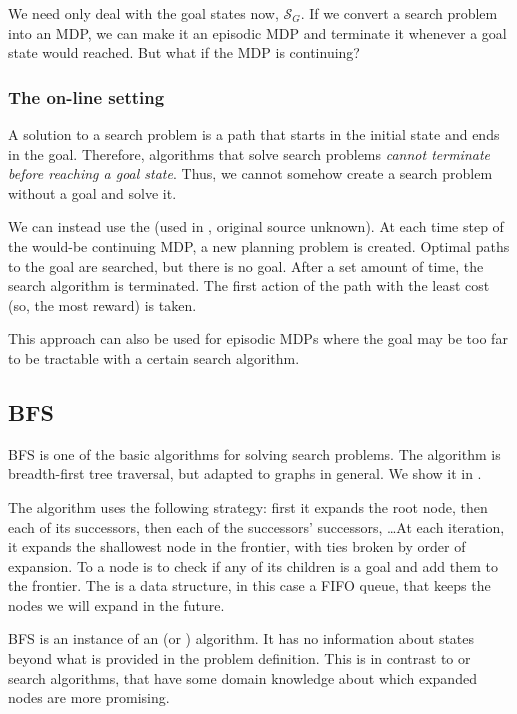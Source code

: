 We need only deal with the goal states now, $\mathcal{S}_G$. If we convert a
search problem into an \ac{MDP}, we can make it an episodic \ac{MDP} and
terminate it whenever a goal state would reached. But what if the \ac{MDP} is
continuing?


\subsubsection{The on-line setting\label{subsec:online-setting}}
A solution to a search problem is a path that starts in the initial state and
ends in the goal. Therefore, algorithms that solve search problems \emph{cannot
terminate before reaching a goal state}. Thus, we cannot somehow create a search
problem without a goal and solve it.

We can instead use the 
(used in \citet{lipovetzky2015classical}, original source unknown). At each time
step of the would-be continuing \ac{MDP}, a new planning problem is created.
Optimal paths to the goal are searched, but there is no goal. After a set amount
of time, the search algorithm is terminated. The first action of the path with
the least cost (so, the most reward) is taken.

This approach can also be used for episodic \acp{MDP} where the goal may be too
far to be tractable with a certain search algorithm.

\subsection{\acl{BFS}}
\acf{BFS} is one of the basic algorithms for solving search problems.
The algorithm is breadth-first tree traversal, but adapted to graphs
in general. We show it in .

The algorithm uses the following strategy: first it expands the root node, then
each of its successors, then each of the successors' successors, \dots At each
iteration, it expands the shallowest node in the frontier, with ties broken
by order of expansion. To  a node is to check if any of
its children is a goal and add them to the frontier. The 
is a data structure, in this case a \ac{FIFO} queue, that keeps the nodes we
will expand in the future.

\ac{BFS} is an instance of an  (or
) algorithm. It has no information about states beyond
what is provided in the problem definition. This is in contrast to
 or  search algorithms, that have
some domain knowledge about which expanded nodes are more promising.

